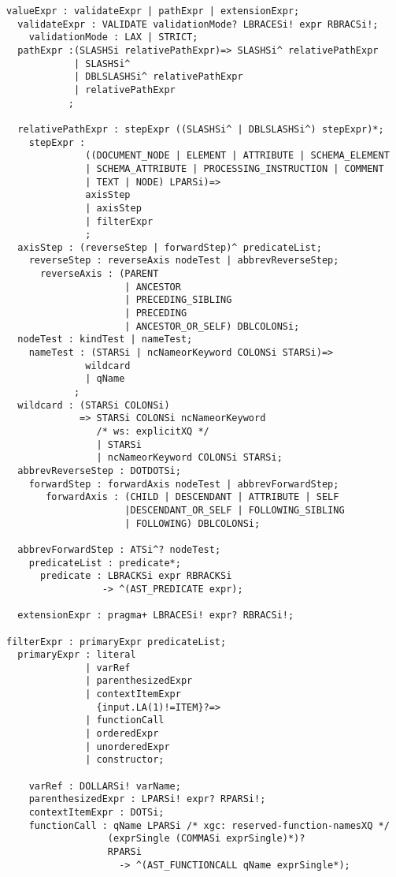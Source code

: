 \begin{Verbatim}[frame=none, fontsize=\footnotesize]
valueExpr : validateExpr | pathExpr | extensionExpr;
  validateExpr : VALIDATE validationMode? LBRACESi! expr RBRACSi!;
    validationMode : LAX | STRICT;
  pathExpr :(SLASHSi relativePathExpr)=> SLASHSi^ relativePathExpr
            | SLASHSi^
            | DBLSLASHSi^ relativePathExpr
            | relativePathExpr
           ;

  relativePathExpr : stepExpr ((SLASHSi^ | DBLSLASHSi^) stepExpr)*;
    stepExpr :
              ((DOCUMENT_NODE | ELEMENT | ATTRIBUTE | SCHEMA_ELEMENT 
              | SCHEMA_ATTRIBUTE | PROCESSING_INSTRUCTION | COMMENT 
              | TEXT | NODE) LPARSi)=> 
              axisStep
              | axisStep
              | filterExpr
              ;
  axisStep : (reverseStep | forwardStep)^ predicateList;
    reverseStep : reverseAxis nodeTest | abbrevReverseStep;
      reverseAxis : (PARENT 
                     | ANCESTOR 
                     | PRECEDING_SIBLING 
                     | PRECEDING 
                     | ANCESTOR_OR_SELF) DBLCOLONSi;
  nodeTest : kindTest | nameTest;
    nameTest : (STARSi | ncNameorKeyword COLONSi STARSi)=>
              wildcard
              | qName 
            ;
  wildcard : (STARSi COLONSi) 
             => STARSi COLONSi ncNameorKeyword
                /* ws: explicitXQ */
                | STARSi
                | ncNameorKeyword COLONSi STARSi;
  abbrevReverseStep : DOTDOTSi;
    forwardStep : forwardAxis nodeTest | abbrevForwardStep;
       forwardAxis : (CHILD | DESCENDANT | ATTRIBUTE | SELF 
                     |DESCENDANT_OR_SELF | FOLLOWING_SIBLING 
                     | FOLLOWING) DBLCOLONSi;

  abbrevForwardStep : ATSi^? nodeTest;
    predicateList : predicate*;
      predicate : LBRACKSi expr RBRACKSi
                 -> ^(AST_PREDICATE expr);

  extensionExpr : pragma+ LBRACESi! expr? RBRACSi!; 

filterExpr : primaryExpr predicateList;
  primaryExpr : literal 
              | varRef 
              | parenthesizedExpr 
              | contextItemExpr 
                {input.LA(1)!=ITEM}?=>
              | functionCall 
              | orderedExpr 
              | unorderedExpr 
              | constructor;

    varRef : DOLLARSi! varName;
    parenthesizedExpr : LPARSi! expr? RPARSi!;
    contextItemExpr : DOTSi;
    functionCall : qName LPARSi /* xgc: reserved-function-namesXQ */
                  (exprSingle (COMMASi exprSingle)*)? 
                  RPARSi
                    -> ^(AST_FUNCTIONCALL qName exprSingle*);


\end{Verbatim}
